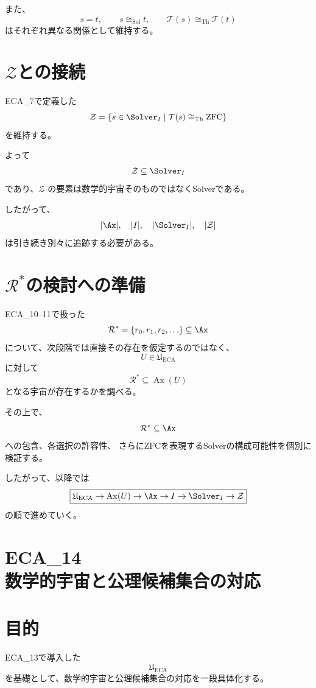 \documentclass[11pt,a4paper]{article}
\begin{document}
また、
\[
s=t,\qquad
s\cong_{\mathrm{Sol}}t,\qquad
\mathcal{T}(s)\cong_{\mathrm{Th}}\mathcal{T}(t)
\]
はそれぞれ異なる関係として維持する。

\section{\(\mathcal{Z}\)との接続}
ECA\_7で定義した
\[
\mathcal{Z}
=
\{s\in\Solver_I\mid
\mathcal{T}(s)\cong_{\mathrm{Th}}\mathrm{ZFC}\}
\]
を維持する。

よって
\[
\mathcal{Z}\subseteq\Solver_I
\]
であり、\(\mathcal{Z}\) の要素は数学的宇宙そのものではなくSolverである。

したがって、
\[
|\Ax|,\quad |I|,\quad|\Solver_I|,\quad|\mathcal{Z}|
\]
は引き続き別々に追跡する必要がある。

\section{\(\mathcal{R}^*\)の検討への準備}
ECA\_10--11で扱った
\[
\mathcal{R}^*=\{r_0,r_1,r_2,\ldots\}\subseteq\Ax
\]
について、次段階では直接その存在を仮定するのではなく、
\[
U\in\mathfrak{U}_{\mathrm{ECA}}
\]
に対して
\[
\mathcal{R}^*\subseteq\operatorname{Ax}(U)
\]
となる宇宙が存在するかを調べる。

その上で、
\[
\mathcal{R}^*\subseteq\Ax
\]
への包含、各選択の許容性、
さらにZFCを表現するSolverの構成可能性を個別に検証する。

したがって、以降では
\[
\boxed{
\mathfrak{U}_{\mathrm{ECA}}
\rightarrow
\operatorname{Ax}(U)
\rightarrow
\Ax
\rightarrow
I
\rightarrow
\Solver_I
\rightarrow
\mathcal{Z}
}
\]
の順で進めていく。















\section{ECA_14\\数学的宇宙と公理候補集合の対応}

\section{目的}
ECA_13で導入した
\[
\mathfrak{U}_{\mathrm{ECA}}
\]
を基礎として、数学的宇宙と公理候補集合の対応を一段具体化する。
\end{document}
